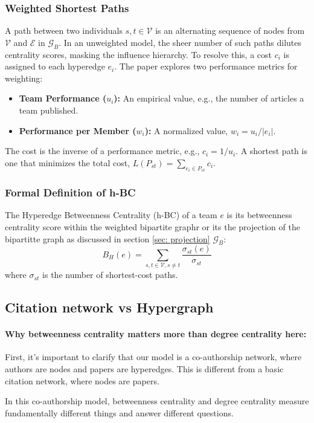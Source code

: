 \documentclass[10pt, a4paper]{article}
\begin{document}
\subsubsection{Weighted Shortest Paths}
A path between two individuals $s,t \in \mathcal{V}$ is an alternating sequence of nodes from $\mathcal{V}$ and $\mathcal{E}$ in $\mathcal{G}_B$. In an unweighted model, the sheer number of such paths dilutes centrality scores, masking the influence hierarchy. To resolve this, a cost $c_i$ is assigned to each hyperedge $e_i$. The paper explores two performance metrics for weighting:
\begin{itemize}
    \item \textbf{Team Performance ($u_i$):} An empirical value, e.g., the number of articles a team published.
    \item \textbf{Performance per Member ($w_i$):} A normalized value, $w_i = u_i / |e_i|$.
\end{itemize}
The cost is the inverse of a performance metric, e.g., $c_i = 1/u_i$. A shortest path is one that minimizes the total cost, $L(P_{st}) = \sum_{e_i \in P_{st}} c_i$.

\subsubsection{Formal Definition of h-BC}
The Hyperedge Betweenness Centrality (h-BC) of a team $e$ is its betweenness centrality score within the weighted bipartite graphr or its the projection of the bipartitte graph as discussed in section \ref{sec: projection} $\mathcal{G}_B$:
\begin{equation}
    B_H(e) = \sum_{s,t \in \mathcal{V}, s \neq t} \frac{\sigma_{st}(e)}{\sigma_{st}}
\end{equation}
where $\sigma_{st}$ is the number of shortest-cost paths. 
\subsection{Citation network vs Hypergraph}
\paragraph{Why betweenness centrality matters more than degree centrality here:} 
First, it's important to clarify that our model is a co-authorship network, where authors are nodes and papers are hyperedges. This is different from a basic citation network, where nodes are papers.

In this co-authorship model, betweenness centrality and degree centrality measure fundamentally different things and answer different questions.
\end{document}
